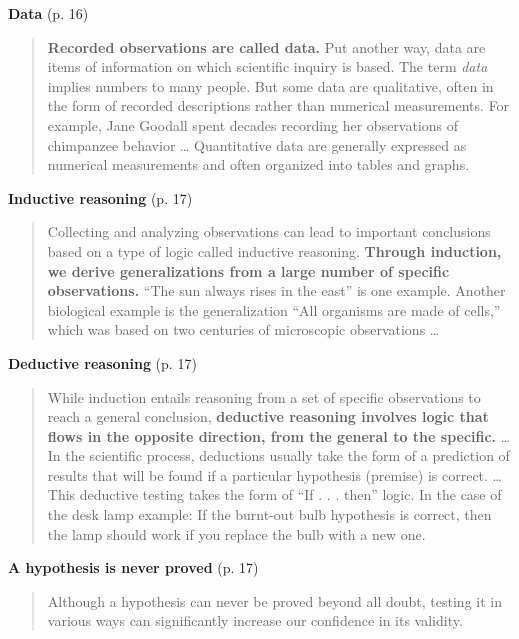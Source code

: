 \documentclass[11pt,letterpaper]{article}
\begin{document}
\textbf{Data} (p. 16)

\begin{quote}
\textbf{Recorded observations are called data.} Put another way, data are items of information on which scientific inquiry is based. The term \emph{data} implies numbers to many people. But some data are qualitative, often in the form of recorded descriptions rather than numerical measurements. For example, Jane Goodall spent decades recording her observations of chimpanzee behavior \dots{} Quantitative data are generally expressed as numerical measurements and often organized into tables and graphs.
\end{quote}

\textbf{Inductive reasoning} (p. 17)

\begin{quote}
Collecting and analyzing observations can lead to important conclusions based on a type of logic called inductive reasoning. \textbf{Through induction, we derive generalizations from a large number of specific observations.} ``The sun always rises in the east'' is one example. Another biological example is the generalization ``All organisms are made of cells,'' which was based on two centuries of microscopic observations \dots{}
\end{quote}

\textbf{Deductive reasoning} (p. 17)

\begin{quote}
While induction entails reasoning from a set of specific observations to reach a general conclusion, \textbf{deductive reasoning involves logic that flows in the opposite direction, from the general to the specific.} \dots{} In the scientific process, deductions usually take the form of a prediction of results that will be found if a particular hypothesis (premise) is correct. \dots{} This deductive testing takes the form of ``If . . . then'' logic. In the case of the desk lamp example: If the burnt-out bulb hypothesis is correct, then the lamp should work if you replace the bulb with a new one.
\end{quote}

\textbf{A hypothesis is never proved} (p. 17)

\begin{quote}
Although a hypothesis can never be proved beyond all doubt, testing it in various ways can significantly increase our confidence in its validity.
\end{quote}

\end{document}
